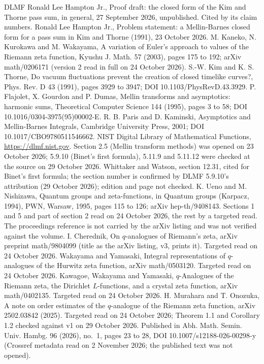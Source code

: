 \documentclass[11pt]{article}
\begin{document}
{\small\sloppy
\begin{thebibliography}{DLMF}
 Ronald Lee Hampton Jr., Proof draft: the closed form of the Kim and Thorne pass sum, in general, 27 September 2026, unpublished. Cited by its claim numbers.
 Ronald Lee Hampton Jr., Problem statement: a Mellin-Barnes closed form for a pass sum in Kim and Thorne (1991), 23 October 2026.
 M. Kaneko, N. Kurokawa and M. Wakayama, A variation of Euler's approach to values of the Riemann zeta function, Kyushu J. Math. 57 (2003), pages 175 to 192; arXiv math/0206171 (version 2 read in full on 24 October 2026).
 S.-W. Kim and K. S. Thorne, Do vacuum fluctuations prevent the creation of closed timelike curves?, Phys. Rev. D 43 (1991), pages 3929 to 3947; DOI 10.1103/PhysRevD.43.3929.
 P. Flajolet, X. Gourdon and P. Dumas, Mellin transforms and asymptotics: harmonic sums, Theoretical Computer Science 144 (1995), pages 3 to 58; DOI 10.1016/0304-3975(95)00002-E.
 R. B. Paris and D. Kaminski, Asymptotics and Mellin-Barnes Integrals, Cambridge University Press, 2001; DOI 10.1017/CBO9780511546662.
 NIST Digital Library of Mathematical Functions, \url{https://dlmf.nist.gov}. Section 2.5 (Mellin transform methods) was opened on 23 October 2026; 5.9.10 (Binet's first formula), 5.11.9 and 5.11.12 were checked at the source on 29 October 2026.
 Whittaker and Watson, section 12.31, cited for Binet's first formula; the section number is confirmed by DLMF 5.9.10's attribution (29 October 2026); edition and page not checked.
 K. Ueno and M. Nishizawa, Quantum groups and zeta-functions, in Quantum groups (Karpacz, 1994), PWN, Warsaw, 1995, pages 115 to 126; arXiv hep-th/9408143. Sections 1 and 5 and part of section 2 read on 24 October 2026, the rest by a targeted read. The proceedings reference is not carried by the arXiv listing and was not verified against the volume.
 I. Cherednik, On $q$-analogues of Riemann's zeta, arXiv preprint math/9804099 (title as the arXiv listing, v3, prints it). Targeted read on 24 October 2026.
 Wakayama and Yamasaki, Integral representations of $q$-analogues of the Hurwitz zeta function, arXiv math/0503120. Targeted read on 24 October 2026.
 Kawagoe, Wakayama and Yamasaki, $q$-Analogues of the Riemann zeta, the Dirichlet $L$-functions, and a crystal zeta function, arXiv math/0402135. Targeted read on 24 October 2026.
 H. Murahara and T. Onozuka, A note on order estimates of the $q$-analogue of the Riemann zeta function, arXiv 2502.03842 (2025). Targeted read on 24 October 2026; Theorem 1.1 and Corollary 1.2 checked against v1 on 29 October 2026. Published in Abh. Math. Semin. Univ. Hambg. 96 (2026), no.~1, pages 23 to 28, DOI 10.1007/s12188-026-00298-y (Crossref metadata read on 2 November 2026; the published text was not opened).

\end{thebibliography}}
\end{document}

